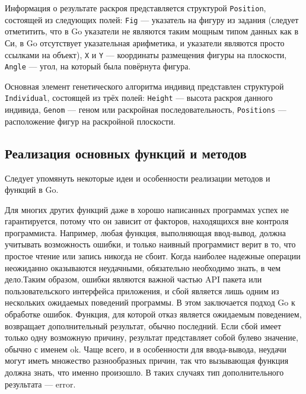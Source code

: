 \documentclass[14pt]{extarticle}
\begin{document}
	Информация о результате раскроя представляется структурой \lstinline|Position|, состоящей из следующих полей: \lstinline|Fig| --- указатель на фигуру из задания (следует отметитить, что в Go указатели не являются таким мощным типом данных как в Си, в Go отсутствует указательная арифметика, и указатели являются просто ссылками на объект), \lstinline|X| и \lstinline|Y| --- координаты размещения фигуры на плоскости, \lstinline|Angle| --- угол, на который была повёрнута фигура.
	

	
	Основная элемент генетического алгоритма индивид представлен структурой \lstinline|Individual|, состоящей из трёх полей: \lstinline|Height| --- высота раскроя данного индивида, \lstinline|Genom| --- геном или раскройная последовательность, \lstinline|Positions| --- расположение фигур на раскройной плоскости.
	
	
	\subsection{Реализация основных функций и методов}
	Следует упомянуть некоторые идеи и особенности реализации методов и функций в Go. 
	
	Для многих других функций даже в хорошо написанных программах успех не гарантируется, потому что он зависит от факторов, находящихся вне контроля програм­миста. Например, любая функция, выполняющая ввод-вывод, должна  учитывать воз­можность ошибки, и только наивный программист верит в то, что простое чтение или запись никогда не сбоит. Когда наиболее надежные операции неожиданно оказыва­ются неудачными, обязательно необходимо знать, в чем дело.Таким образом, ошибки являются важной частью API пакета или пользовательского интерфейса приложения, и сбой является лишь одним из нескольких ожидаемых поведений программы. В этом 	заключается подход Go к обработке ошибок. Функция, для которой отказ является ожидаемым поведением, возвращает дополнительный результат, обычно последний. Если сбой имеет только одну возможную причину, результат представляет собой булево значение, обычно с именем ok. Чаще всего, и в особенности для ввода-вывода, неудачи могут иметь множество разнообразных причин, так что вызывающая функция должна знать, что именно про­изошло. В таких случаях тип дополнительного результата — error.
	
\end{document}

